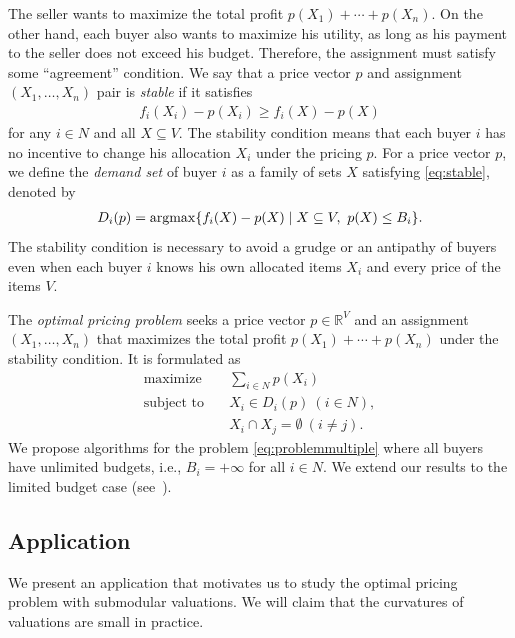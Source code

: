 \documentclass[letterpaper]{article}
\newcommand{\argmax}{\operatornamewithlimits{argmax}}
\theoremstyle{definition}
\begin{document}
The seller wants to maximize the total profit $p(X_1) + \cdots + p(X_n)$.
On the other hand, each buyer also wants to maximize his utility, as long as his payment to the seller does not exceed his budget.
Therefore, the assignment must satisfy some ``agreement'' condition.
We say that a price vector $p$ and assignment $(X_1, \ldots, X_n)$ pair is \emph{stable}
if it satisfies
\begin{align}
  \label{eq:stable}
  f_i(X_i) - p(X_i) \ge f_i(X) - p(X)
\end{align}
for any $i \in N$ and all $X \subseteq V$.
The stability condition means that each buyer $i$ has no incentive to change his allocation $X_i$ under the pricing $p$.
For a price vector $p$, we define the \emph{demand set} of buyer $i$ as a family of sets $X$ satisfying \eqref{eq:stable}, denoted by
\begin{align}\label{eq:demandset}
  D_i(p) = \argmax \{ f_i(X) - p(X) \mid X \subseteq V, \ p(X) \leq B_i \}.
\end{align}
The stability condition is necessary to avoid a grudge or an antipathy of buyers even when each buyer $i$ knows his own allocated items $X_i$ and every price of the items $V$.


The \emph{optimal pricing problem} %
seeks a price vector $p\in \mathbb{R}^V$ and an assignment $(X_1, \ldots, X_n)$ that maximizes the total profit $p(X_1) + \cdots + p(X_n)$ under the stability condition.
It is formulated as
\begin{align}
    \text{maximize}&\textstyle \quad \sum_{i\in N}p(X_i)  \nonumber \\
    \text{subject to}&\quad X_i \in D_i(p) ~(i \in N), \label{eq:problemmultiple} \\
    &\quad X_i \cap X_j = \emptyset ~(i \neq j). \nonumber
\end{align}
We propose algorithms for the problem \eqref{eq:problemmultiple} where all buyers have unlimited budgets, i.e., $B_i = +\infty$ for all $i \in N$.
We extend our results to the limited budget case (see~\cite{maehara2017optimal}).

\subsection{Application}
\label{subsec:budgetallocation}


We present an application that motivates us to study the optimal pricing problem with submodular valuations.
We will claim that the curvatures of valuations are small in practice.
\end{document}
